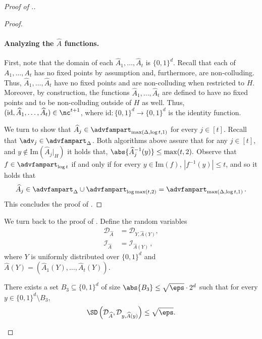 \documentclass{toc}
\begin{document}
\begin{proof}[Proof of .]
\begin{proof}
%
\paragraph{Analyzing the $\widehat{A}$ functions.}
First, note that the domain of each $\widehat{A}_1,\ldots,\widehat{A}_t$ is $\{0,1\}^d$. Recall that each of $A_1,\ldots,A_t$ has no fixed points by assumption and, furthermore, are non-colluding. Thus, $\widehat{A}_1,\ldots,\widehat{A}_t$ have no fixed points and are non-colluding when restricted to $H$. Moreover, by construction, the functions $\widehat{A}_1,\ldots,\widehat{A}_t$ are defined to have no fixed points and to be non-colluding outside of $H$ as well. Thus,  $(\mathrm{id},\widehat{A}_1,\ldots,\widehat{A}_t) \in \nc^{t+1}$, where $\mathrm{id} \colon \{0,1\}^d \to \{0,1\}^d$ is the identity function. 

We turn to show that $\widehat{A}_j \in \advfampart_{\max(\Delta, \log t,1)}$ for every $j \in [t]$.  
Recall that $\adv_j \in \advfampart_{\Delta}$. Both algorithms above assure that for any $j\in [t]$, and $y \notin \mathrm{Im}(\widehat{A}_j|_H)$ it holds that, $\abs{\widehat{A}_j^{-1}(y)} \leq \max(t,2).$
Observe that $f \in \advfampart_{\log t}$ if and only if 
for every $y \in \mathrm{Im}(f)$, $|f^{-1}(y)| \le t$,
and so
it holds that
\[
\widehat{A}_j \in \advfampart_{\Delta} \cup \advfampart_{\log \max(t,2)} =\advfampart_{\max(\Delta, \log t,1)}\,.
\]
This concludes the proof of .
\end{proof}

We turn back to the proof of .
%
Define the random variables
\begin{align*}
    \mathcal{D}_{\widehat{A}} &= \mathcal{D}_{Y,\widehat{A}(Y)},\\
    \mathcal{I}_{\widehat{A}} &= \mathcal{I}_{\widehat{A}(Y)}\,,
\end{align*}
where $Y$ is uniformly distributed over $\{0,1\}^d$ and $\widehat{A}(Y) =  (\widehat{A}_1(Y),\ldots,\widehat{A}_t(Y))$.

%

\begin{claim}\label{claim:d is concentrated}
	There exists a set $B_3 \subseteq \{0,1\}^d$ of size $\abs{B_3} \le \sqrt{\eps} \cdot 2^d$ such that for every $y \in \{0,1\}^d \setminus B_3$,
	\[
	\SD\left(\mathcal{D}_{\widehat{A}}, \mathcal{D}_{y,\widehat{A}(y)}\right) \le \sqrt{\eps}.
	\]
\end{claim}


\end{proof}
\end{document}
